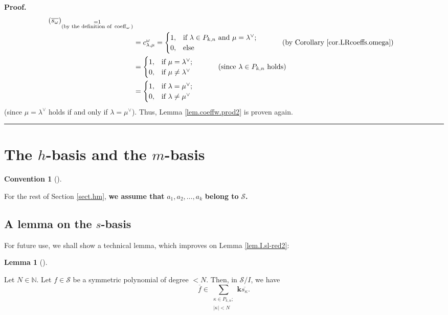 \documentclass[numbers=enddot,12pt,final,onecolumn,notitlepage]{scrartcl}%
\theoremstyle{definition}
\newtheorem{lem}[theo]{Lemma}
\newenvironment{lemma}[1][]
{\begin{lem}[#1]\begin{leftbar}}
{\end{leftbar}\end{lem}}
\newtheorem{conv}[theo]{Convention}
\newenvironment{convention}[1][]
{\begin{conv}[#1]\begin{leftbar}}
{\end{leftbar}\end{conv}}
\newenvironment{proof}[1][Proof]{\noindent\textbf{#1.} }{\ \rule{0.5em}{0.5em}}
\newenvironment{convention}[1][Convention]{\noindent\textbf{#1.} }{\ \rule{0.5em}{0.5em}}
\newenvironment{convention}[1][Convention]{\noindent\textbf{#1.} }{\ \rule{0.5em}{0.5em}}
\let\sumnonlimits\sum
\renewcommand{\sum}{\sumnonlimits\limits}
\begin{document}
\begin{proof}
\begin{align*}
{{}\left(  \overline{s_{\omega}}\right)  }_{\substack{=1\\\text{(by the
definition of }\operatorname*{coeff}\nolimits_{\omega}\text{)}}}\\
&  =c_{\lambda,\mu}^{\omega}=%
\begin{cases}
1, & \text{if }\lambda\in P_{k,n}\text{ and }\mu=\lambda^{\vee};\\
0, & \text{else}%
\end{cases}
\ \ \ \ \ \ \ \ \ \ \left(  \text{by Corollary \ref{cor.LRcoeffs.omega}%
}\right) \\
&  =%
\begin{cases}
1, & \text{if }\mu=\lambda^{\vee};\\
0, & \text{if }\mu\neq\lambda^{\vee}%
\end{cases}
\ \ \ \ \ \ \ \ \ \ \left(  \text{since }\lambda\in P_{k,n}\text{
holds}\right) \\
&  =%
\begin{cases}
1, & \text{if }\lambda=\mu^{\vee};\\
0, & \text{if }\lambda\neq\mu^{\vee}%
\end{cases}
\end{align*}
(since $\mu=\lambda^{\vee}$ holds if and only if $\lambda=\mu^{\vee}$). Thus,
Lemma \ref{lem.coeffw.prod2} is proven again.
\end{proof}

\section{\label{sect.hm}The $h$-basis and the $m$-basis}

\begin{convention}
For the rest of Section \ref{sect.hm}, \textbf{we assume that }$a_{1}%
,a_{2},\ldots,a_{k}$ \textbf{belong to }$\mathcal{S}$\textbf{.}
\end{convention}

\subsection{A lemma on the $s$-basis}

For future use, we shall show a technical lemma, which improves on Lemma
\ref{lem.I.sl-red2}:

\begin{lemma}
\label{lem.sm-as-Pkn}Let $N\in\mathbb{N}$. Let $f\in\mathcal{S}$ be a
symmetric polynomial of degree $<N$. Then, in $\mathcal{S}/I$, we have
\[
\overline{f}\in\sum_{\substack{\kappa\in P_{k,n};\\\left\vert \kappa
\right\vert <N}}\mathbf{k}\overline{s_{\kappa}}.
\]

\end{lemma}
\end{document}
